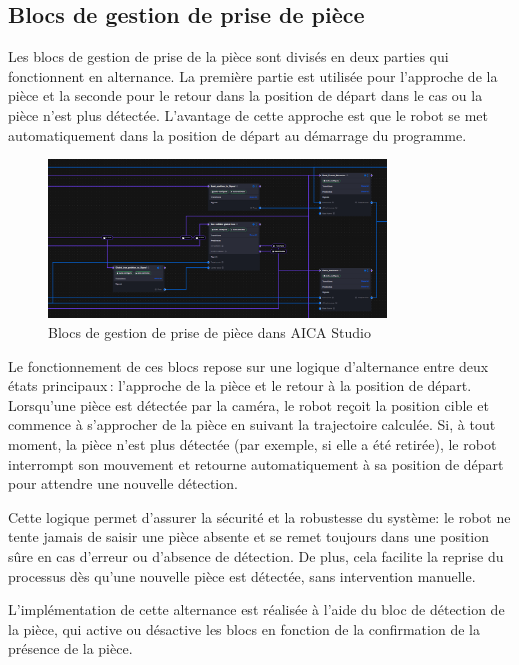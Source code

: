 \subsection{Blocs de gestion de prise de pièce}

Les blocs de gestion de prise de la pièce sont divisés en deux parties qui fonctionnent en alternance. La première partie est utilisée pour l'approche de la pièce et la seconde pour le retour dans la position de départ dans le cas ou la pièce n'est plus détectée. L'avantage de cette approche est que le robot se met automatiquement dans la position de départ au démarrage du programme.

\begin{figure}[H]
    \centering
    \includegraphics[width=0.8\textwidth]{assets/figures/AICA_Prise (2).png}
    \caption{Blocs de gestion de prise de pièce dans AICA Studio}
    \label{fig:piece_block}
\end{figure}


Le fonctionnement de ces blocs repose sur une logique d'alternance entre deux états principaux : l'approche de la pièce et le retour à la position de départ. Lorsqu'une pièce est détectée par la caméra, le robot reçoit la position cible et commence à s'approcher de la pièce en suivant la trajectoire calculée. Si, à tout moment, la pièce n'est plus détectée (par exemple, si elle a été retirée), le robot interrompt son mouvement et retourne automatiquement à sa position de départ pour attendre une nouvelle détection.

Cette logique permet d'assurer la sécurité et la robustesse du système: le robot ne tente jamais de saisir une pièce absente et se remet toujours dans une position sûre en cas d'erreur ou d'absence de détection. De plus, cela facilite la reprise du processus dès qu'une nouvelle pièce est détectée, sans intervention manuelle.

L'implémentation de cette alternance est réalisée à l'aide du bloc de détection de la pièce, qui active ou désactive les blocs en fonction de la confirmation de la présence de la pièce.


